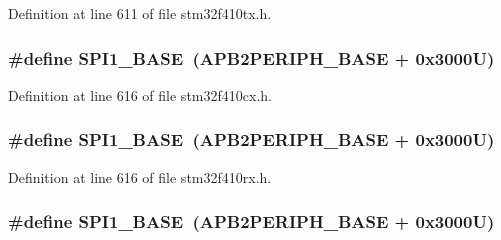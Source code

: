 Definition at line 611 of file stm32f410tx.\+h.

\subsubsection[{\texorpdfstring{S\+P\+I1\+\_\+\+B\+A\+SE}{SPI1_BASE}}]{\setlength{\rightskip}{0pt plus 5cm}\#define S\+P\+I1\+\_\+\+B\+A\+SE~({\bf A\+P\+B2\+P\+E\+R\+I\+P\+H\+\_\+\+B\+A\+SE} + 0x3000\+U)}\hypertarget{group___peripheral__registers__structures_ga50cd8b47929f18b05efbd0f41253bf8d}{}\label{group___peripheral__registers__structures_ga50cd8b47929f18b05efbd0f41253bf8d}


Definition at line 616 of file stm32f410cx.\+h.

\subsubsection[{\texorpdfstring{S\+P\+I1\+\_\+\+B\+A\+SE}{SPI1_BASE}}]{\setlength{\rightskip}{0pt plus 5cm}\#define S\+P\+I1\+\_\+\+B\+A\+SE~({\bf A\+P\+B2\+P\+E\+R\+I\+P\+H\+\_\+\+B\+A\+SE} + 0x3000\+U)}\hypertarget{group___peripheral__registers__structures_ga50cd8b47929f18b05efbd0f41253bf8d}{}\label{group___peripheral__registers__structures_ga50cd8b47929f18b05efbd0f41253bf8d}


Definition at line 616 of file stm32f410rx.\+h.

\subsubsection[{\texorpdfstring{S\+P\+I1\+\_\+\+B\+A\+SE}{SPI1_BASE}}]{\setlength{\rightskip}{0pt plus 5cm}\#define S\+P\+I1\+\_\+\+B\+A\+SE~({\bf A\+P\+B2\+P\+E\+R\+I\+P\+H\+\_\+\+B\+A\+SE} + 0x3000\+U)}\hypertarget{group___peripheral__registers__structures_ga50cd8b47929f18b05efbd0f41253bf8d}{}\label{group___peripheral__registers__structures_ga50cd8b47929f18b05efbd0f41253bf8d}


